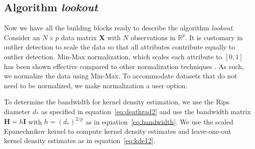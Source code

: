\documentclass[letter,12pt]{article}
\begin{document}

   


\subsection{Algorithm \textit{lookout}}

Now we have all the building blocks ready to describe the algorithm \textit{lookout}. Consider an $N \times p$  data matrix $\bm{X}$ with $N$ observations in $\mathbb{R}^p$.  It is customary in outlier detection to scale the data so that all attributes contribute equally to outlier detection. Min-Max normalization, which scales each attribute to $[0, 1]$ has been shown effective compared to other normalization  techniques \citep{kandanaarachchi2018normalization}. As such, we  normalize the data using Min-Max. To accommodate  datasets that do not need to be normalized, we make normalization a user option.

To determine the bandwidth for kernel density estimation, we use the Rips diameter $d_*$ as specified in equation~\eqref{eq:deathrad2} and use the bandwidth matrix $\bm{H} = h \bm{I}$ with $h = (d_*)^{2/p}$ as in equation~\eqref{eq:bandwidth}. We use the scaled Epanechnikov kernel to compute kernel density estimates and leave-one-out kernel density estimates as in equation~\eqref{eq:kde12}. 
\end{document}
